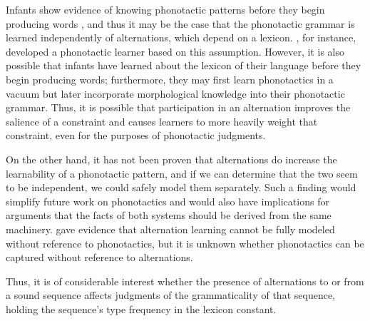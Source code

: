 

Infants show evidence of knowing phonotactic patterns before they begin
producing words \citep{Werker1984,Kuhl2006}, and thus it may be the case that
the phonotactic grammar is learned independently of alternations, which depend
on a lexicon. \citet{Adriaans2010}, for instance, developed a phonotactic
learner based on this assumption. However, it is also possible that infants
have learned about the lexicon of their language before they begin producing
words; furthermore, they may first learn phonotactics in a vacuum but later
incorporate morphological knowledge into their phonotactic grammar. Thus, it is
possible that participation in an alternation improves the salience of a
constraint and causes learners to more heavily weight that constraint, even for
the purposes of phonotactic judgments.

On the other hand, it has not been proven that alternations do increase the
learnability of a phonotactic pattern, and if we can determine that the two
seem to be independent, we could safely model them separately.  Such a finding
would simplify future work on phonotactics and would also have implications for
arguments that the facts of both systems should be derived from the same
machinery. \citet{Pater2003a} gave evidence that alternation learning cannot be
fully modeled without reference to phonotactics, but it is unknown whether
phonotactics can be captured without reference to alternations.

Thus, it is of considerable interest whether the presence of alternations to or
from a sound sequence affects judgments of the grammaticality of that sequence,
holding the sequence's type frequency in the lexicon constant.

